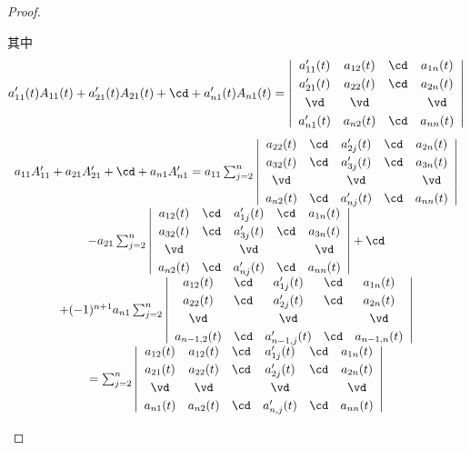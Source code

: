 \begin{frame}
\begin{proof}
\begin{itemize}
其中
$$
a_{11}^\prime(t) A_{11}(t) +  a_{21}^\prime(t) A_{21}(t)
+ \cd + a_{n1}^\prime(t) A_{n1}(t)
= 
\left|
\begin{array}{cccc}
a_{11}^\prime(t)&a_{12}(t)&\cd&a_{1n}(t)\\[0.1cm]
a_{21}^\prime(t)&a_{22}(t)&\cd&a_{2n}(t)\\[0.1cm]
\vd&\vd&&\vd\\[0.1cm]
a_{n1}^\prime(t)&a_{n2}(t)&\cd&a_{nn}(t)
\end{array}
\right| 
$$
$$
\begin{array}{c}
a_{11}A_{11}^\prime +  a_{21}A_{21}^\prime + \cd + a_{n1}A_{n1}^\prime
=a_{11} \sum_{j=2}^n \left|
\begin{array}{ccccc}
a_{22}(t)&\cd&a_{2j}^\prime(t)&\cd&a_{2n}(t)\\[0.1cm]
a_{32}(t)&\cd&a_{3j}^\prime(t)&\cd&a_{3n}(t)\\[0.1cm]
\vd&&\vd&&\vd\\[0.1cm]
a_{n2}(t)&\cd&a_{nj}^\prime(t)&\cd&a_{nn}(t)
\end{array}
\right| \\[0.3in]
-  a_{21}\sum_{j=2}^n \left|
\begin{array}{ccccc}
a_{12}(t)&\cd&a_{1j}^\prime(t)&\cd&a_{1n}(t)\\[0.1cm]
a_{32}(t)&\cd&a_{3j}^\prime(t)&\cd&a_{3n}(t)\\[0.1cm]
\vd&&\vd&&\vd\\[0.1cm]
a_{n2}(t)&\cd&a_{nj}^\prime(t)&\cd&a_{nn}(t)
\end{array}
\right| + \cd \\[0.3in]
+ (-1)^{n+1}a_{n1}\sum_{j=2}^n \left|
\begin{array}{ccccc}
a_{12}(t)&\cd&a_{1j}^\prime(t)&\cd&a_{1n}(t)\\[0.1cm]
a_{22}(t)&\cd&a_{2j}^\prime(t)&\cd&a_{2n}(t)\\[0.1cm]
\vd&&\vd&&\vd\\[0.1cm]
a_{n-1,2}(t)&\cd&a_{n-1,j}^\prime(t)&\cd&a_{n-1,n}(t)
\end{array}
\right| \\[0.3in]
= \sum_{j=2}^n \left|
\begin{array}{cccccc}
a_{12}(t)& a_{12}(t)&\cd&a_{1j}^\prime(t)&\cd&a_{1n}(t)\\[0.1cm]
a_{21}(t)& a_{22}(t)&\cd&a_{2j}^\prime(t)&\cd&a_{2n}(t)\\[0.1cm]
\vd&\vd&&\vd&&\vd\\[0.1cm]
a_{n1}(t)& a_{n2}(t)&\cd&a_{n,j}^\prime(t)&\cd&a_{nn}(t)
\end{array}
\right|
\end{array}
$$
\end{itemize}
\end{proof}





\end{frame}


